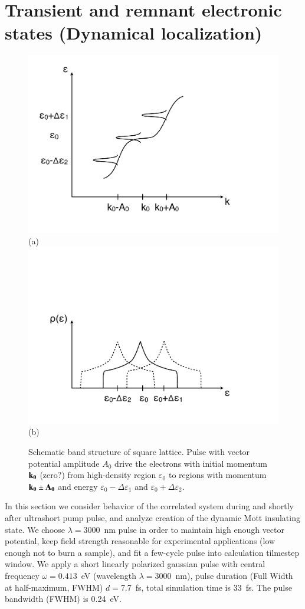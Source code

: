 
\section{\label{Transient} Transient and remnant electronic states (Dynamical localization)}

\begin{figure}
\includegraphics[width=0.5\linewidth,angle=0]{figures/Sketch1.pdf}(a)
\includegraphics[width=0.5\linewidth,angle=0]{figures/Sketch2.pdf}(b)
\caption{Schematic band structure of square lattice. Pulse with vector potential amplitude $A_0$ drive the electrons with initial momentum $\bf k_0$ (zero?) from high-density region $\varepsilon_0$ to regions with momentum $\bf k_{0} \pm A_0$ and energy $\varepsilon_{0}-\Delta\varepsilon_{1}$ and $\varepsilon_{0}+\Delta\varepsilon_{2}$. 
{\color{red}{@HA I don't understand this figure AT ALL! }}
{\color{blue}{@VV Maximal intensity of Hubbard bands appears at certain values of the vector potential, namely at zeros of the zero order Bessel function ($J_0(A)$). This effect could also be called dynamical localization, because renormalizing the hoppings we increase effective Coulomb U; and at $J_0(A)=0$ we have the perfect Mott insulator.}}
}
\label{BandPulse}  
\end{figure}

In this section we consider behavior of the correlated system during and shortly after ultrashort pump pulse, and
analyze creation of the dynamic Mott insulating state.
We choose $\lambda=3000$~nm pulse in order to maintain high enough vector potential, keep field strength reasonable for experimental applications
(low enough not to burn a sample), and fit a few-cycle pulse into calculation tilmestep window. 
We apply a short linearly polarized gaussian pulse with central frequency $\omega=0.413$~eV (wavelength $\lambda=3000$~nm), pulse duration (Full Width at half-maximum, FWHM) $d =$7.7~fs, total simulation time is 33~fs. The pulse bandwidth (FWHM) is 0.24~eV.

